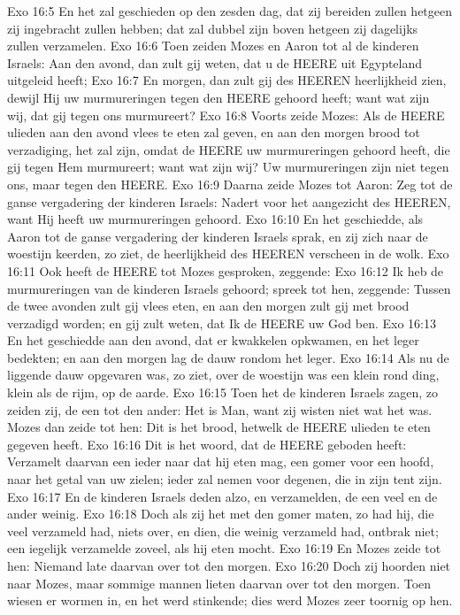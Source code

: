 Exo 16:5  En het zal geschieden op den zesden dag, dat zij bereiden zullen hetgeen zij ingebracht zullen hebben; dat zal dubbel zijn boven hetgeen zij dagelijks zullen verzamelen.
Exo 16:6  Toen zeiden Mozes en Aaron tot al de kinderen Israels: Aan den avond, dan zult gij weten, dat u de HEERE uit Egypteland uitgeleid heeft;
Exo 16:7  En morgen, dan zult gij des HEEREN heerlijkheid zien, dewijl Hij uw murmureringen tegen den HEERE gehoord heeft; want wat zijn wij, dat gij tegen ons murmureert?
Exo 16:8  Voorts zeide Mozes: Als de HEERE ulieden aan den avond vlees te eten zal geven, en aan den morgen brood tot verzadiging, het zal zijn, omdat de HEERE uw murmureringen gehoord heeft, die gij tegen Hem murmureert; want wat zijn wij? Uw murmureringen zijn niet tegen ons, maar tegen den HEERE.
Exo 16:9  Daarna zeide Mozes tot Aaron: Zeg tot de ganse vergadering der kinderen Israels: Nadert voor het aangezicht des HEEREN, want Hij heeft uw murmureringen gehoord.
Exo 16:10  En het geschiedde, als Aaron tot de ganse vergadering der kinderen Israels sprak, en zij zich naar de woestijn keerden, zo ziet, de heerlijkheid des HEEREN verscheen in de wolk.
Exo 16:11  Ook heeft de HEERE tot Mozes gesproken, zeggende:
Exo 16:12  Ik heb de murmureringen van de kinderen Israels gehoord; spreek tot hen, zeggende: Tussen de twee avonden zult gij vlees eten, en aan den morgen zult gij met brood verzadigd worden; en gij zult weten, dat Ik de HEERE uw God ben.
Exo 16:13  En het geschiedde aan den avond, dat er kwakkelen opkwamen, en het leger bedekten; en aan den morgen lag de dauw rondom het leger.
Exo 16:14  Als nu de liggende dauw opgevaren was, zo ziet, over de woestijn was een klein rond ding, klein als de rijm, op de aarde.
Exo 16:15  Toen het de kinderen Israels zagen, zo zeiden zij, de een tot den ander: Het is Man, want zij wisten niet wat het was. Mozes dan zeide tot hen: Dit is het brood, hetwelk de HEERE ulieden te eten gegeven heeft.
Exo 16:16  Dit is het woord, dat de HEERE geboden heeft: Verzamelt daarvan een ieder naar dat hij eten mag, een gomer voor een hoofd, naar het getal van uw zielen; ieder zal nemen voor degenen, die in zijn tent zijn.
Exo 16:17  En de kinderen Israels deden alzo, en verzamelden, de een veel en de ander weinig.
Exo 16:18  Doch als zij het met den gomer maten, zo had hij, die veel verzameld had, niets over, en dien, die weinig verzameld had, ontbrak niet; een iegelijk verzamelde zoveel, als hij eten mocht.
Exo 16:19  En Mozes zeide tot hen: Niemand late daarvan over tot den morgen.
Exo 16:20  Doch zij hoorden niet naar Mozes, maar sommige mannen lieten daarvan over tot den morgen. Toen wiesen er wormen in, en het werd stinkende; dies werd Mozes zeer toornig op hen.
